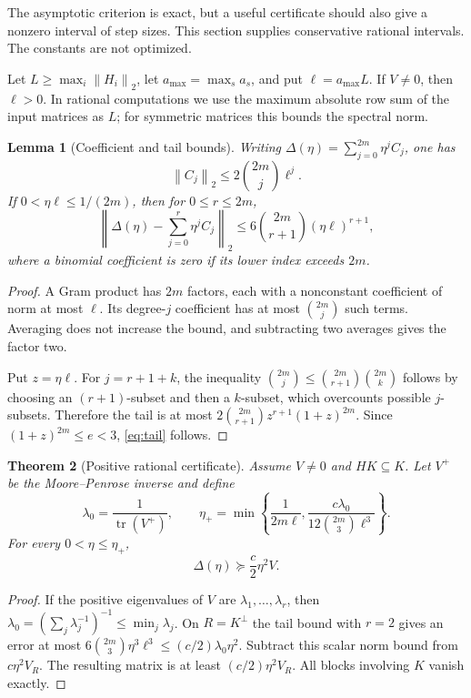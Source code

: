 \documentclass[11pt,letterpaper]{article}
\numberwithin{equation}{section}
\newtheorem{theorem}{Theorem}[section]
\newtheorem{lemma}[theorem]{Lemma}
\theoremstyle{definition}
\newcommand{\tr}{\operatorname{tr}}
\newcommand{\norm}[1]{\left\lVert #1\right\rVert}
\begin{document}
The asymptotic criterion is exact, but a useful certificate should also give a nonzero interval of step sizes. This section supplies conservative rational intervals. The constants are not optimized.

Let $L\ge\max_i\norm{H_i}_2$, let $a_{\max}=\max_s a_s$, and put $\ell=a_{\max}L$. If $V\ne0$, then $\ell>0$. In rational computations we use the maximum absolute row sum of the input matrices as $L$; for symmetric matrices this bounds the spectral norm.

\begin{lemma}[Coefficient and tail bounds]\label{lem:tail}
Writing $\Delta(\eta)=\sum_{j=0}^{2m}\eta^jC_j$, one has
\begin{equation}\label{eq:coefficientbound}
 \norm{C_j}_2\le2\binom{2m}{j}\ell^j.
\end{equation}
If $0<\eta\ell\le1/(2m)$, then for $0\le r\le2m$,
\begin{equation}\label{eq:tail}
 \left\lVert\Delta(\eta)-\sum_{j=0}^r\eta^jC_j\right\rVert_2
 \le6\binom{2m}{r+1}(\eta\ell)^{r+1},
\end{equation}
where a binomial coefficient is zero if its lower index exceeds $2m$.
\end{lemma}
\begin{proof}
A Gram product has $2m$ factors, each with a nonconstant coefficient of norm at most $\ell$. Its degree-$j$ coefficient has at most $\binom{2m}{j}$ such terms. Averaging does not increase the bound, and subtracting two averages gives the factor two.

Put $z=\eta\ell$. For $j=r+1+k$, the inequality
$\binom{2m}{j}\le\binom{2m}{r+1}\binom{2m}{k}$ follows by choosing an $(r+1)$-subset and then a $k$-subset, which overcounts possible $j$-subsets. Therefore the tail is at most
$2\binom{2m}{r+1}z^{r+1}(1+z)^{2m}$.
Since $(1+z)^{2m}\le e<3$, \eqref{eq:tail} follows.
\end{proof}

\begin{theorem}[Positive rational certificate]\label{thm:positivecert}
Assume $V\ne0$ and $HK\subseteq K$. Let $V^+$ be the Moore--Penrose inverse and define
\begin{equation}\label{eq:positiveeta}
 \lambda_0=\frac1{\tr(V^+)},\qquad
 \eta_+=\min\left\{\frac1{2m\ell},
   \frac{c\lambda_0}{12\binom{2m}{3}\ell^3}\right\}.
\end{equation}
For every $0<\eta\le\eta_+$,
\[
 \Delta(\eta)\succeq\frac c2\eta^2V.
\]
\end{theorem}
\begin{proof}
If the positive eigenvalues of $V$ are $\lambda_1,\ldots,\lambda_r$, then
$\lambda_0=(\sum_j\lambda_j^{-1})^{-1}\le\min_j\lambda_j$.
On $R=K^\perp$ the tail bound with $r=2$ gives an error at most
$6\binom{2m}{3}\eta^3\ell^3\le(c/2)\lambda_0\eta^2$.
Subtract this scalar norm bound from $c\eta^2V_R$. The resulting matrix is at least $(c/2)\eta^2V_R$. All blocks involving $K$ vanish exactly.
\end{proof}
\end{document}
